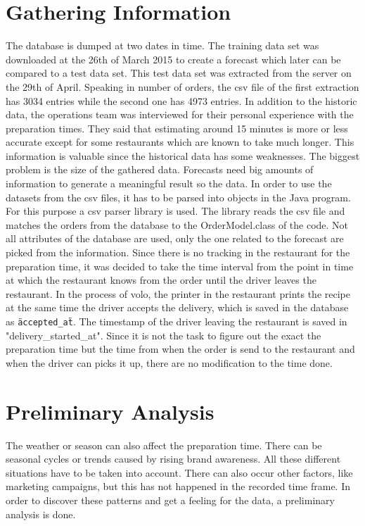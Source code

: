 \section{Gathering Information}\label{section:Gathering Information}
The database is dumped at two dates in time. The training data set was downloaded at the 26th of March 2015 to create a forecast which later can be compared to a test data set. This test data set was extracted from the server on the 29th of April. Speaking in number of orders, the csv file of the first extraction has 3034 entries while the second one has 4973 entries. In addition to the historic data, the operations team was interviewed for their personal experience with the preparation times. They said that estimating around 15 minutes is more or less accurate except for some restaurants which are known to take much longer.\newline
This information is valuable since the historical data has some weaknesses. The biggest problem is the size of the gathered data. Forecasts need big amounts of information to generate a meaningful result so the data.\newline
In order to use the datasets from the csv files, it has to be parsed into objects in the Java program. For this purpose a csv parser library is used. The library reads the csv file and matches the orders from the database to the OrderModel.class of the code. Not all attributes of the database are used, only the one related to the forecast are picked from the information. Since there is no tracking in the restaurant for the preparation time, it was decided to take the time interval from the point in time at which the restaurant knows from the order until the driver leaves the restaurant. In the process of volo, the printer in the restaurant prints the recipe at the same time the driver accepts the delivery, which is saved in the database as \texttt{\"accepted\_at\"}. The timestamp of the driver leaving the restaurant is saved in "delivery\_started_at". Since it is not the task to figure out the exact the preparation time but the time from when the order is send to the restaurant and when the driver can picks it up, there are no modification to the time done.
\section{Preliminary Analysis}\label{section:Preliminary Analysis}
The weather or season can also affect the preparation time. There can be seasonal cycles or trends caused by rising brand awareness. All these different situations have to be taken into account. There can also occur other factors, like marketing campaigns, but this has not happened in the recorded time frame. In order to discover these patterns and get a feeling for the data, a preliminary analysis is done.
